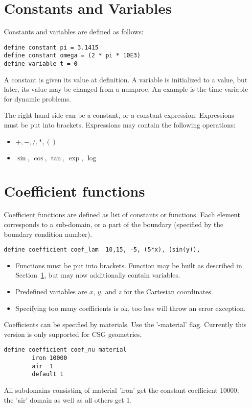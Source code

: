 \documentclass[12pt]{book}
\begin{document}
\section{Constants and Variables}
\label{sec_constants}
Constants and variables are defined as follows:
\begin{verbatim}
define constant pi = 3.1415
define constant omega = (2 * pi * 10E3)
define variable t = 0
\end{verbatim}
A constant is given its value at definition. A variable is
initialized to a value, but later, its value may be changed
from a numproc. An example is the time variable for dynamic problems.

The right hand side can be a constant, or a constant expression.
Expressions must be put into brackets. Expressions may contain the following
operations:
\begin{itemize}
\item
$+,-,/,*,( )$
\item
$\sin$, $\cos$, $\tan$, $\exp$, $\log$
\end{itemize}

\section{Coefficient functions}

Coefficient functions are defined as list of constants or functions. 
Each element corresponds to a sub-domain, or a part of the boundary (specified
by the boundary condition number).

\begin{verbatim}
define coefficient coef_lam  10,15, -5, (5*x), (sin(y)),
\end{verbatim}
\begin{itemize}
\item
Functions must be put into brackets. Function may be built as described
in Section~\ref{sec_constants}, but may now additionally contain 
variables. 
\item
Predefined variables are $x$, $y$, and $z$ for the Cartesian coordinates.
\item
Specifying too many coefficients is ok, too less will throw an error exception.
\end{itemize}

Coefficients can be specified by materials. Use the '-material' flag. Currently this version is only supported for CSG geometries.
\begin{verbatim}
define coefficient coef_nu material
        iron 10000
        air  1
        default 1
\end{verbatim}
All subdomains consisting of material 'iron' get the constant coefficient 10000,
the 'air' domain as well as all others get 1.
\end{document}
